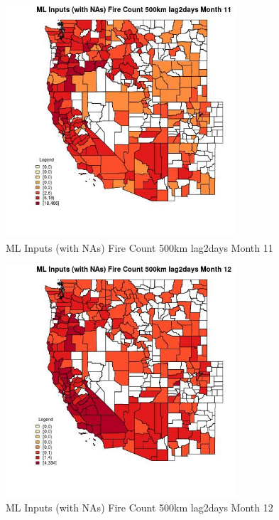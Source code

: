 \begin{figure} 
\centering  
\includegraphics[width=0.77\textwidth]{Code_Outputs/Report_ML_input_PM25_Step4_part_e_de_duplicated_aves_compiled_2019-05-21wNAs_CountyFire_Count_500km_lag2daysmedianMonth11.jpg} 
\caption{\label{fig:Report_ML_input_PM25_Step4_part_e_de_duplicated_aves_compiled_2019-05-21wNAsCountyFire_Count_500km_lag2daysmedianMonth11}ML Inputs (with NAs) Fire Count 500km lag2days Month 11} 
\end{figure} 
 

\begin{figure} 
\centering  
\includegraphics[width=0.77\textwidth]{Code_Outputs/Report_ML_input_PM25_Step4_part_e_de_duplicated_aves_compiled_2019-05-21wNAs_CountyFire_Count_500km_lag2daysmedianMonth12.jpg} 
\caption{\label{fig:Report_ML_input_PM25_Step4_part_e_de_duplicated_aves_compiled_2019-05-21wNAsCountyFire_Count_500km_lag2daysmedianMonth12}ML Inputs (with NAs) Fire Count 500km lag2days Month 12} 
\end{figure} 
 

